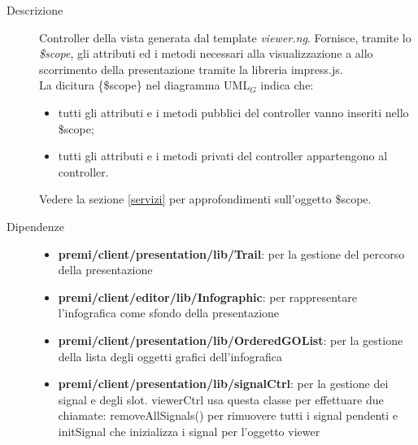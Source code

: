 \begin{description}
\item[Descrizione] \hfill
	Controller della vista generata dal template \textit{viewer.ng}. Fornisce, tramite lo \textit{\$scope}, gli attributi ed i metodi necessari alla visualizzazione a allo scorrimento della presentazione tramite la libreria impress.js.
	\\ La dicitura \{\$scope\} nel diagramma UML$_G$ indica che:
\begin{itemize}
\item tutti gli attributi e i metodi pubblici del controller vanno inseriti nello \$scope;
\item tutti gli attributi e i metodi privati del controller appartengono al controller.
\end{itemize}
Vedere la sezione \ref{servizi} per approfondimenti sull'oggetto \$scope.
	
	
	
\item[Dipendenze] \hfill
	\begin{itemize}
		\item \textbf{premi/client/presentation/lib/Trail}: per la gestione del percorso della presentazione
		\item \textbf{premi/client/editor/lib/Infographic}: per rappresentare l'infografica come sfondo della presentazione
		\item \textbf{premi/client/presentation/lib/OrderedGOList}: per la gestione della lista degli oggetti grafici dell'infografica
		\item \textbf{premi/client/presentation/lib/signalCtrl}: per la gestione dei signal e degli slot. viewerCtrl usa questa classe per effettuare due chiamate: removeAllSignals() per rimuovere tutti i signal pendenti e initSignal che inizializza i signal per l'oggetto viewer
	\end{itemize}
	

\end{description}
